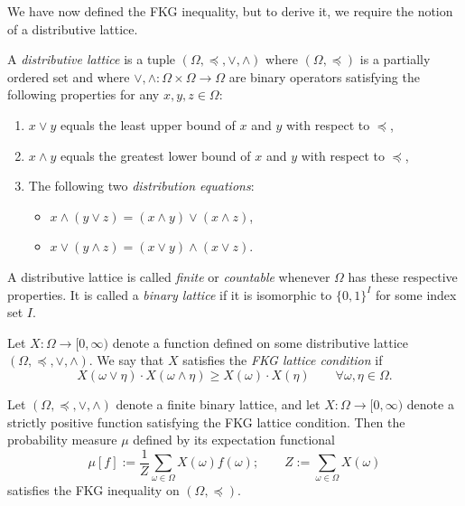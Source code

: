 We have now defined the FKG inequality,
but to derive it, we require the notion of a distributive lattice.

\begin{definition}
    A \emph{distributive lattice} is a tuple $(\Omega,\preceq,\vee,\wedge)$
    where $(\Omega,\preceq)$ is a partially ordered set
    and where $\vee,\wedge:\Omega\times\Omega\to\Omega$
    are binary operators satisfying the following properties
    for any $x,y,z\in\Omega$:
    \begin{enumerate}
        \item $x\vee y$ equals the least upper bound of $x$ and $y$ with respect to $\preceq$,
        \item $x\wedge y$ equals the greatest lower bound of $x$ and $y$ with respect to $\preceq$,
        \item The following two \emph{distribution equations}:
            \begin{itemize}
                \item $x\wedge (y\vee z)=(x\wedge y)\vee(x\wedge z)$,
                \item $x\vee (y\wedge z)=(x\vee y)\wedge(x\vee z)$.
            \end{itemize}
    \end{enumerate}
    A distributive lattice is called \emph{finite} or \emph{countable}
    whenever $\Omega$ has these respective properties.
    It is called a \emph{binary lattice} if it is isomorphic
    to $\{0,1\}^I$ for some index set $I$.
\end{definition}

\begin{definition}
    Let $X:\Omega\to[0,\infty)$ denote a
    function defined on some distributive lattice $(\Omega,\preceq,\vee,\wedge)$.
    We say that $X$ satisfies the \emph{FKG lattice condition}
    if
    \begin{equation}
        X(\omega\vee\eta)\cdot X(\omega\wedge\eta)
        \geq
        X(\omega)\cdot X(\eta)
        \qquad
        \forall\omega,\eta\in\Omega.
    \end{equation}
\end{definition}

\begin{theorem}[FKG, 1971]
    \label{thm:original_FKG}
    Let $(\Omega,\preceq,\vee,\wedge)$ denote a finite binary lattice,
    and let $X:\Omega\to[0,\infty)$ denote a strictly positive function
    satisfying the FKG lattice condition.
    Then the probability measure $\mu$ defined by its expectation functional
    \[
        \mu[f]:=\frac1Z\sum_{\omega\in\Omega}X(\omega)f(\omega);
        \qquad Z:=\sum_{\omega\in\Omega}X(\omega)
    \]
    satisfies the FKG inequality on $(\Omega,\preceq)$.
\end{theorem}


